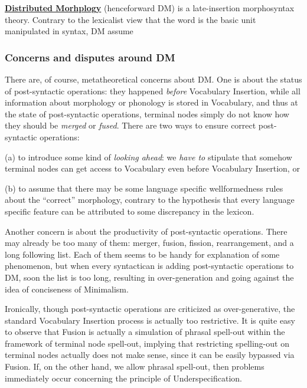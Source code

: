 \documentclass[a4paper]{article}
\newcommand*{\concept}[1]{\underline{\textbf{#1}}}
\begin{document}
\concept{Distributed Morhplogy} (henceforward DM) is a late-insertion morphosyntax theory.
Contrary to the lexicalist view that the word is the basic unit manipulated in syntax, DM assume

\subsubsection{Concerns and disputes around DM}

There are, of course, metatheoretical concerns about DM.
One is about the status of post-syntactic operations: they happened \emph{before} Vocabulary Insertion, while all information about morphology or phonology is stored in Vocabulary, and thus at the state of post-syntactic operations, terminal nodes simply do not know how they should be \emph{merged} or \emph{fused}.
There are two ways to ensure correct post-syntactic operations: 
\begin{inparaitem}
    \item[(a)] to introduce some kind of \emph{looking ahead}: we \emph{have to} stipulate that somehow terminal nodes can get access to Vocabulary even before Vocabulary Insertion, or 
    \item[(b)] to assume that there may be some language specific wellformedness rules about the ``correct'' morphology, contrary to the hypothesis that every language specific feature can be attributed to some discrepancy in the lexicon.
\end{inparaitem}


Another concern is about the productivity of post-syntactic operations.
There may already be too many of them: merger, fusion, fission, rearrangement, and a long following list.
Each of them seems to be handy for explanation of some phenomenon, but when every syntactican is adding post-syntactic operations to DM, soon the list is too long, resulting in over-generation and going against the idea of conciseness of Minimalism.

Ironically, though post-syntactic operations are criticized as over-generative, the standard Vocabulary Insertion process is actually too restrictive.
It is quite easy to observe that Fusion is actually a simulation of phrasal spell-out within the framework of terminal node spell-out, implying that restricting spelling-out on terminal nodes actually does not make sense, since it can be easily bypassed via Fusion.
If, on the other hand, we allow phrasal spell-out, then problems immediately occur concerning the principle of Underspecification.
\end{document}

